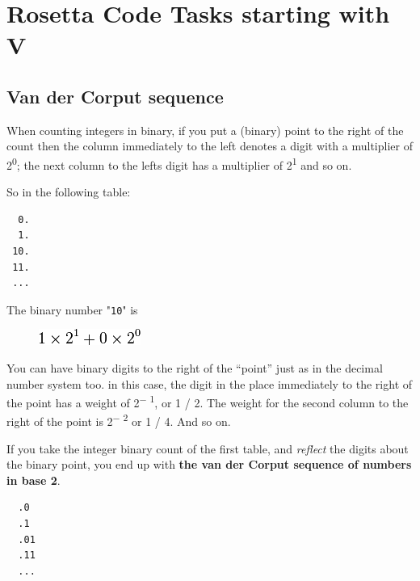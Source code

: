 %
%
%

\chapter{Rosetta Code Tasks starting with V}

\section*{Van der Corput sequence}

When counting integers in binary, if you put a (binary) point to the
right of the count then the column immediately to the left denotes a
digit with a multiplier of 2\textsuperscript{0}; the next column to the
lefts digit has a multiplier of 2\textsuperscript{1} and so on.

So in the following table:

\begin{verbatim}
  0.
  1.
 10.
 11.
 ...
\end{verbatim}

The binary number "\texttt{10}" is

\begin{figure}[H]
  \centering
  \includegraphics[scale=.6]{graphics/c7d9360aa57a7763c0e4764be5571c7b.png}  
\end{figure}

You can have binary digits to the right of the ``point'' just as in the
decimal number system too. in this case, the digit in the place
immediately to the right of the point has a weight of
2\textsuperscript{− 1}, or 1 / 2. The weight for the second column to
the right of the point is 2\textsuperscript{− 2} or 1 / 4. And so on.

\pagebreak{}
If you take the integer binary count of the first table, and
\emph{reflect} the digits about the binary point, you end up with
\textbf{the van der Corput sequence of numbers in base 2}.

\begin{verbatim}
  .0
  .1
  .01
  .11
  ...
\end{verbatim}

